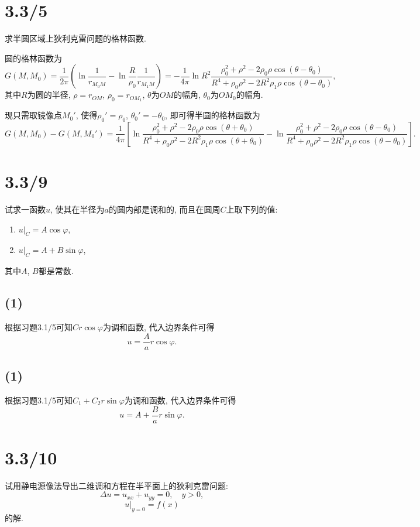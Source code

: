 \documentclass[11pt,a4paper]{article}
\begin{document}
\section{3.3/5}
\begin{problem}
求半圆区域上狄利克雷问题的格林函数.
\end{problem}
圆的格林函数为
$$G(M,M_0)=\frac{1}{2\pi}\left(\ln\frac{1}{r_{M_0M}}-\ln\frac{R}{\rho_0}\frac{1}{r_{M_1M}}\right)=-\frac{1}{4\pi}\ln R^2\frac{\rho_0^2+\rho^2-2\rho_0\rho\cos(\theta-\theta_0)}{R^4+\rho_0\rho^2-2R^2\rho_1\rho\cos(\theta-\theta_0)},$$
其中$R$为圆的半径, $\rho=r_{OM}$, $\rho_0=r_{OM_1}$, $\theta$为$OM$的幅角, $\theta_0$为$OM_0$的幅角.

现只需取镜像点$M_0'$, 使得$\rho_0'=\rho_0$, $\theta_0'=-\theta_0$, 即可得半圆的格林函数为
$$G(M,M_0)-G(M,M_0')=\frac{1}{4\pi}\left[\ln\frac{\rho_0^2+\rho^2-2\rho_0\rho\cos(\theta+\theta_0)}{R^4+\rho_0\rho^2-2R^2\rho_1\rho\cos(\theta+\theta_0)}-\ln\frac{\rho_0^2+\rho^2-2\rho_0\rho\cos(\theta-\theta_0)}{R^4+\rho_0\rho^2-2R^2\rho_1\rho\cos(\theta-\theta_0)}\right].$$

\section{3.3/9}
\begin{problem}
试求一函数$u$, 使其在半径为$a$的圆内部是调和的, 而且在圆周$C$上取下列的值:
\begin{enumerate}
  \item $u|_C=A\cos\varphi$,
  \item $u|_C=A+B\sin\varphi$,
\end{enumerate}
其中$A$, $B$都是常数.
\end{problem}

\subsection*{(1)}
根据习题3.1/5可知$Cr\cos\varphi$为调和函数, 代入边界条件可得
$$u=\frac{A}{a}r\cos\varphi.$$

\subsection*{(1)}
根据习题3.1/5可知$C_1+C_2r\sin\varphi$为调和函数, 代入边界条件可得
$$u=A+\frac{B}{a}r\sin\varphi.$$

\section{3.3/10}
\begin{problem}
试用静电源像法导出二维调和方程在半平面上的狄利克雷问题:
$$\Delta u=u_{xx}+u_{yy}=0,\quad y>0,$$
$$u|_{y=0}=f(x)$$
的解.
\end{problem}
\end{document}
